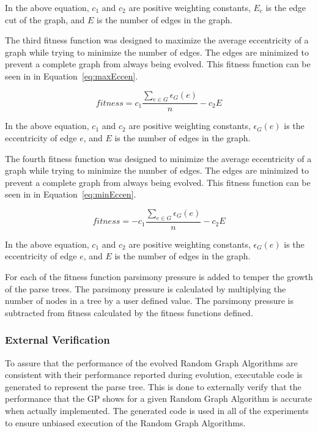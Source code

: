 \documentclass{article}
\begin{document}
In the above equation, $c_1$ and $c_2$ are positive weighting constants, $E_c$ is the edge cut of the graph, and $E$ is the number of edges in the graph.



The third fitness function was designed to maximize the average eccentricity of a graph while trying to minimize the number of edges. The edges are minimized
to prevent a complete graph from always being evolved. This fitness function can be seen in in Equation~\ref{eq:maxEccen}.


\begin{equation}
\label{eq:maxEccen}
fitness = c_1\frac{\sum\limits_{e \in G}\epsilon_{G}(e)}{n} - c_2E
\end{equation}

In the above equation, $c_1$ and $c_2$ are positive weighting constants, $\epsilon_{G}(e)$ is the eccentricity of edge $e$, and $E$ is the number of edges in the graph.


The fourth fitness function was designed to minimize the average eccentricity of a graph while trying to minimize the number of edges. The edges are minimized to 
prevent a complete graph from always being evolved. This fitness function
can be seen in in Equation~\ref{eq:minEccen}.


\begin{equation}
\label{eq:minEccen}
fitness = -c_1\frac{\sum\limits_{e \in G}\epsilon_{G}(e)}{n} - c_2E
\end{equation}

In the above equation, $c_1$ and $c_2$ are positive weighting constants, $\epsilon_{G}(e)$ is the eccentricity of edge $e$, and $E$ is the number of edges in the graph.

For each of the fitness function parsimony pressure is added to temper the growth of the parse trees. The parsimony pressure is calculated by multiplying the number
of nodes in a tree by a user defined value. The parsimony pressure is subtracted from fitness calculated by the fitness functions defined.

\subsubsection{External Verification}
To assure that the performance of the evolved Random Graph Algorithms are consistent with their performance reported during evolution,
executable code is generated to represent the parse tree. This is done to externally verify that the performance that the GP shows for a
given Random Graph Algorithm is accurate when actually implemented. The generated code is used in all of the experiments to ensure unbiased execution 
of the Random Graph Algorithms.
\end{document}
